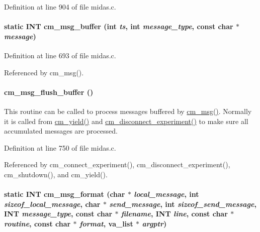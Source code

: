 Definition at line 904 of file midas.c.
\paragraph[{cm\_\-msg\_\-buffer}]{\setlength{\rightskip}{0pt plus 5cm}static {\bf INT} cm\_\-msg\_\-buffer (int {\em ts}, \/  int {\em message\_\-type}, \/  const char $\ast$ {\em message})}\hfill\label{group__msgfunctionc_ga6ba42e516854f36cf4295d6947067d1a}


Definition at line 693 of file midas.c.

Referenced by cm\_\-msg().
\paragraph[{cm\_\-msg\_\-flush\_\-buffer}]{ cm\_\-msg\_\-flush\_\-buffer ()}\hfill\label{group__msgfunctionc_gaa28e2fd30622699b67e7b0116da2923c}
This routine can be called to process messages buffered by \hyperlink{group__msgfunctionc_gaac032ca2438c47466bfc9722de6746ea}{cm\_\-msg()}. Normally it is called from \hyperlink{group__cmfunctionc_ga115565c5a1d9591fcabf844c1dd624f8}{cm\_\-yield()} and \hyperlink{group__cmfunctionc_ga7d5a287821786e8dde3d2340826215b2}{cm\_\-disconnect\_\-experiment()} to make sure all accumulated messages are processed. 

Definition at line 750 of file midas.c.

Referenced by cm\_\-connect\_\-experiment(), cm\_\-disconnect\_\-experiment(), cm\_\-shutdown(), and cm\_\-yield().
\paragraph[{cm\_\-msg\_\-format}]{\setlength{\rightskip}{0pt plus 5cm}static {\bf INT} cm\_\-msg\_\-format (char $\ast$ {\em local\_\-message}, \/  int {\em sizeof\_\-local\_\-message}, \/  char $\ast$ {\em send\_\-message}, \/  int {\em sizeof\_\-send\_\-message}, \/  {\bf INT} {\em message\_\-type}, \/  const char $\ast$ {\em filename}, \/  {\bf INT} {\em line}, \/  const char $\ast$ {\em routine}, \/  const char $\ast$ {\em format}, \/  va\_\-list $\ast$ {\em argptr})}\hfill\label{group__msgfunctionc_gaddfa3777e3786fbb1f3f6c759e59d7dd}


